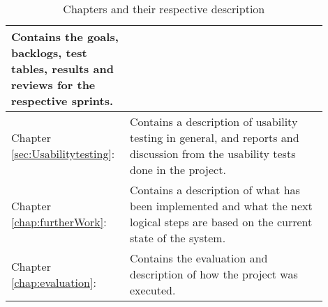 \begin{table}
\begin{center}
\begin{tabular}{|p{0.3\linewidth}|p{0.6\linewidth}|}
			Contains the goals, backlogs, test tables, results and reviews for the respective sprints. \\
		\hline
			Chapter \ref{sec:Usabilitytesting}: \nameref{sec:Usabilitytesting} &
			Contains a description of usability testing in general, and reports and discussion from the 
			usability tests done in the project.\\
		\hline
			Chapter \ref{chap:furtherWork}: \nameref{chap:furtherWork} & 
			Contains a description of what has been implemented and what the next logical steps 
			are based on the current state of the system. \\
		\hline
			Chapter \ref{chap:evaluation}: \nameref{chap:evaluation} & 
			Contains the evaluation and description of how the project was executed. \\
		\hline
	\end{tabular}
	\end{center}
	\caption{Chapters and their respective description}
	\label{tab:chapters}
\end{table}
